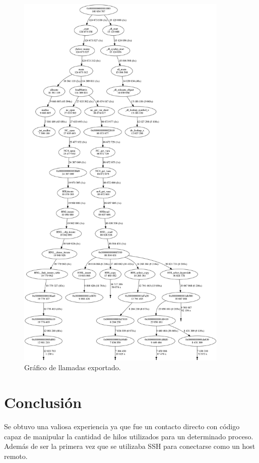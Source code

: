 \documentclass[a4paper]{article}
\begin{document}
\begin{figure}[]
	\begin{center}		
	\includegraphics[width=0.9\textwidth]{output.png}
  	\caption{Gráfico de llamadas exportado.}
  	\label{fig:totalgraph}
  	\end{center}
\end{figure}

\section{Conclusión}
Se obtuvo una valiosa experiencia ya que fue un contacto directo con código capaz de manipular la cantidad de hilos utilizados para un determinado proceso. Además de ser la primera vez que se utilizaba SSH para conectarse como un host remoto.
\end{document}
